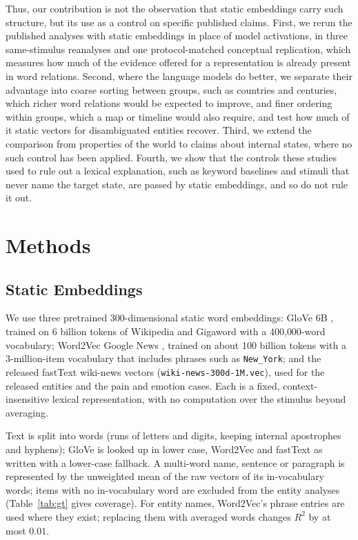 \documentclass[11pt]{article}
\begin{document}
Thus, our contribution is not the observation that static embeddings carry such structure, but its use as a control on specific published claims. First, we rerun the published analyses with static embeddings in place of model activations, in three same-stimulus reanalyses and one protocol-matched conceptual replication, which measures how much of the evidence offered for a representation is already present in word relations. Second, where the language models do better, we separate their advantage into coarse sorting between groups, such as countries and centuries, which richer word relations would be expected to improve, and finer ordering within groups, which a map or timeline would also require, and test how much of it static vectors for disambiguated entities recover. Third, we extend the comparison from properties of the world to claims about internal states, where no such control has been applied. Fourth, we show that the controls these studies used to rule out a lexical explanation, such as keyword baselines and stimuli that never name the target state, are passed by static embeddings, and so do not rule it out.

\section{Methods}

\subsection{Static Embeddings}

We use three pretrained 300-dimensional static word embeddings: GloVe 6B
\citep{pennington2014glove}, trained on 6 billion tokens of Wikipedia and Gigaword with a
400{,}000-word vocabulary; Word2Vec Google News \citep{mikolov2013efficient}, trained on
about 100 billion tokens with a 3-million-item vocabulary that includes phrases such as
\texttt{New\_York}; and the released fastText wiki-news vectors \citep{bojanowski2017enriching}
(\texttt{wiki-news-300d-1M.vec}), used for the released entities and the pain and emotion cases.
Each is a fixed, context-insensitive lexical representation, with no computation over the stimulus beyond averaging.

Text is split into words (runs of letters and digits, keeping internal apostrophes and
hyphens); GloVe is looked up in lower case, Word2Vec and fastText as written with a lower-case
fallback. A multi-word name, sentence or paragraph is represented by the unweighted mean of the
raw vectors of its in-vocabulary words; items with no in-vocabulary word are excluded from the
entity analyses (Table~\ref{tab:gt} gives coverage). For entity names, Word2Vec's phrase
entries are used where they exist; replacing them with averaged words changes $R^2$ by at most
$0.01$.
\end{document}
